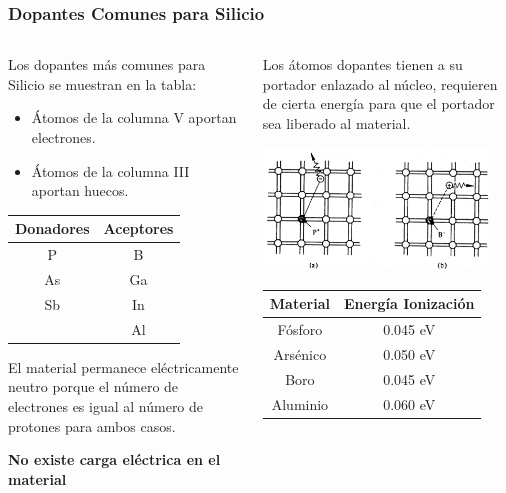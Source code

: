 \documentclass[10pt,t,aspectratio=169]{beamer}
\begin{document}
\begin{frame}[t]
  \frametitle{Dopantes Comunes para Silicio}

  \begin{columns}
    \begin{column}{0.5\textwidth}
      Los dopantes más comunes para Silicio se muestran en la tabla:
      \begin{itemize}
        \item Átomos de la columna V aportan electrones.
        \item Átomos de la columna III aportan huecos.
      \end{itemize}

      \begin{table}[H]
        \centering
        \begin{tabular}{cc}
          \hline \textbf{Donadores} & \textbf{Aceptores} \\
          \hline P & B \\
          As & Ga \\
          Sb & In \\
          & Al \\
          \hline
        \end{tabular}
      \end{table}

      \centering El material permanece eléctricamente neutro porque el número de electrones es igual al número de protones para ambos casos.

      \vspace{4mm}
      \textbf{No existe carga eléctrica en el material}
    \end{column}
    \begin{column}{0.5\textwidth}
      \centering
      Los átomos dopantes tienen a su portador enlazado al núcleo, requieren de cierta energía para que el portador sea liberado al material.

      \includegraphics[width=6cm]{./figures/dopado5.png}

      \begin{table}[H]
        \centering
        \begin{tabular}{cc}
          \hline \textbf{Material} & \textbf{Energía Ionización}\\
          \hline Fósforo & 0.045 eV \\
          Arsénico & 0.050 eV \\
          Boro & 0.045 eV \\
          Aluminio & 0.060 eV \\
          \hline
        \end{tabular}
      \end{table}
    \end{column}
  \end{columns}
\end{frame}
\end{document}
